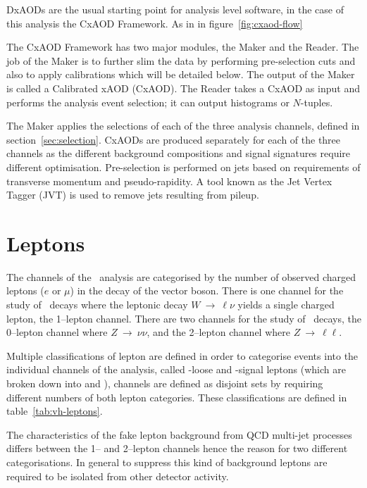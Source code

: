 DxAODs are the usual starting point for analysis level software, in the case of
this analysis the CxAOD Framework. As in in figure~\ref{fig:cxaod-flow}

The CxAOD Framework has two major modules, the Maker and the Reader. The job of
the Maker is to further slim the data by performing pre-selection cuts and also
to apply calibrations which will be detailed below. The output of the Maker is
called a Calibrated xAOD (CxAOD). The Reader takes a CxAOD as input and performs
the analysis event selection; it can output histograms or $N$-tuples.

The Maker applies the selections of each of the three analysis channels, defined
in section~\ref{sec:selection}. CxAODs are produced separately for each of the
three channels as the different background compositions and signal signatures
require different optimisation. Pre-selection is performed on jets based on
requirements of transverse momentum and pseudo-rapidity. A tool known as the Jet
Vertex Tagger (JVT) is used to remove jets resulting from pileup.

\section{Leptons}%
\label{sec:lepton}

The channels of the \VHbb\ analysis are categorised by the number of
observed charged leptons ($e$ or $\mu$) in the decay of the vector boson. There
is one channel for the study of \WHbb\ decays where the leptonic
decay $W~\rightarrow~\ell\nu$ yields a single charged lepton, the 1--lepton
channel. There are two channels for the study of \ZHbb\ decays, the
0--lepton channel where $Z~\rightarrow~\nu\nu$, and the 2--lepton channel where
$Z~\rightarrow~\ell\ell$.

Multiple classifications of lepton are defined in order to categorise events into the
individual channels of the analysis, called \VH-loose and \VH-signal
leptons (which are broken down into \WH and \ZH), channels are defined as
disjoint sets by requiring different numbers of both lepton categories. These
classifications are defined in table~\ref{tab:vh-leptons}.

The characteristics of the fake lepton background from QCD multi-jet processes
differs between the 1-- and 2--lepton channels hence the reason for two
different categorisations. In general to suppress this kind of background
leptons are required to be isolated from other detector activity.


